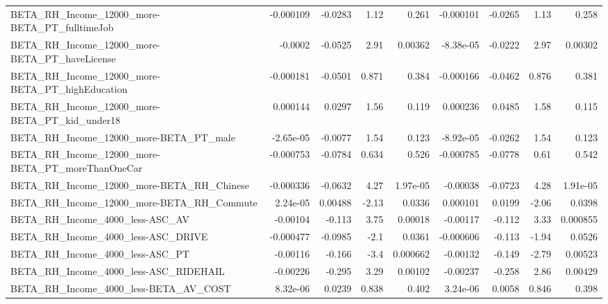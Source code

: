 \begin{tabular}{lrrrrrrrr}
BETA\_RH\_Income\_12000\_more-BETA\_PT\_fulltimeJob      &   -0.000109 &      -0.0283 &     1.12 &    0.261 &  -0.000101 &     -0.0265 &         1.13 &         0.258 \\
BETA\_RH\_Income\_12000\_more-BETA\_PT\_haveLicense      &     -0.0002 &      -0.0525 &     2.91 &  0.00362 &  -8.38e-05 &     -0.0222 &         2.97 &       0.00302 \\
BETA\_RH\_Income\_12000\_more-BETA\_PT\_highEducation    &   -0.000181 &      -0.0501 &    0.871 &    0.384 &  -0.000166 &     -0.0462 &        0.876 &         0.381 \\
BETA\_RH\_Income\_12000\_more-BETA\_PT\_kid\_under18      &    0.000144 &       0.0297 &     1.56 &    0.119 &   0.000236 &      0.0485 &         1.58 &         0.115 \\
BETA\_RH\_Income\_12000\_more-BETA\_PT\_male             &   -2.65e-05 &      -0.0077 &     1.54 &    0.123 &  -8.92e-05 &     -0.0262 &         1.54 &         0.123 \\
BETA\_RH\_Income\_12000\_more-BETA\_PT\_moreThanOneCar   &   -0.000753 &      -0.0784 &    0.634 &    0.526 &  -0.000785 &     -0.0778 &         0.61 &         0.542 \\
BETA\_RH\_Income\_12000\_more-BETA\_RH\_Chinese          &   -0.000336 &      -0.0632 &     4.27 & 1.97e-05 &   -0.00038 &     -0.0723 &         4.28 &      1.91e-05 \\
BETA\_RH\_Income\_12000\_more-BETA\_RH\_Commute          &    2.24e-05 &      0.00488 &    -2.13 &   0.0336 &   0.000101 &      0.0199 &        -2.06 &        0.0398 \\
BETA\_RH\_Income\_4000\_less-ASC\_AV                    &    -0.00104 &       -0.113 &     3.75 &  0.00018 &   -0.00117 &      -0.112 &         3.33 &      0.000855 \\
BETA\_RH\_Income\_4000\_less-ASC\_DRIVE                 &   -0.000477 &      -0.0985 &     -2.1 &   0.0361 &  -0.000606 &      -0.113 &        -1.94 &        0.0526 \\
BETA\_RH\_Income\_4000\_less-ASC\_PT                    &    -0.00116 &       -0.166 &     -3.4 & 0.000662 &   -0.00132 &      -0.149 &        -2.79 &       0.00523 \\
BETA\_RH\_Income\_4000\_less-ASC\_RIDEHAIL              &    -0.00226 &       -0.295 &     3.29 &  0.00102 &   -0.00237 &      -0.258 &         2.86 &       0.00429 \\
BETA\_RH\_Income\_4000\_less-BETA\_AV\_COST              &    8.32e-06 &       0.0239 &    0.838 &    0.402 &   3.24e-06 &      0.0058 &        0.846 &         0.398 \\

\end{tabular}

